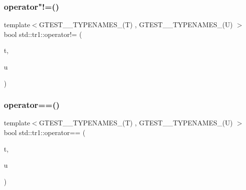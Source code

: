 \mbox{\label{namespacestd_1_1tr1_a058882c51de469b5e78d29076f864940}} 
\subsubsection{\texorpdfstring{operator"!=()}{operator!=()}}
{\footnotesize\ttfamily template$<$G\+T\+E\+S\+T\+\_\+\_\+\+T\+Y\+P\+E\+N\+A\+M\+E\+S\+\_\+(\+T) , G\+T\+E\+S\+T\+\_\+\_\+\+T\+Y\+P\+E\+N\+A\+M\+E\+S\+\_\+(\+U) $>$ \\
bool std\+::tr1\+::operator!= (\begin{DoxyParamCaption}\item[{const \hyperlink{namespacestd_1_1tr1_aa636d3269bf1f368a7bc09ff158bc482}{G\+T\+E\+S\+T\+\_\+10\+\_\+\+T\+U\+P\+L\+E\+\_\+}(T)\&}]{t,  }\item[{const \hyperlink{namespacestd_1_1tr1_aa636d3269bf1f368a7bc09ff158bc482}{G\+T\+E\+S\+T\+\_\+10\+\_\+\+T\+U\+P\+L\+E\+\_\+}(U)\&}]{u }\end{DoxyParamCaption})\hspace{0.3cm}{\ttfamily [inline]}}

\mbox{\label{namespacestd_1_1tr1_af4516de784404381f9b14797694b6311}} 
\subsubsection{\texorpdfstring{operator==()}{operator==()}}
{\footnotesize\ttfamily template$<$G\+T\+E\+S\+T\+\_\+\_\+\+T\+Y\+P\+E\+N\+A\+M\+E\+S\+\_\+(\+T) , G\+T\+E\+S\+T\+\_\+\_\+\+T\+Y\+P\+E\+N\+A\+M\+E\+S\+\_\+(\+U) $>$ \\
bool std\+::tr1\+::operator== (\begin{DoxyParamCaption}\item[{const \hyperlink{namespacestd_1_1tr1_aa636d3269bf1f368a7bc09ff158bc482}{G\+T\+E\+S\+T\+\_\+10\+\_\+\+T\+U\+P\+L\+E\+\_\+}(T)\&}]{t,  }\item[{const \hyperlink{namespacestd_1_1tr1_aa636d3269bf1f368a7bc09ff158bc482}{G\+T\+E\+S\+T\+\_\+10\+\_\+\+T\+U\+P\+L\+E\+\_\+}(U)\&}]{u }\end{DoxyParamCaption})\hspace{0.3cm}{\ttfamily [inline]}}



